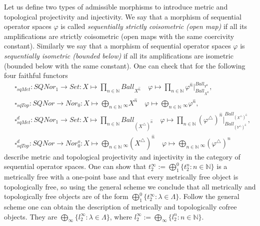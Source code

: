 \documentclass[a0b,landscape]{a0poster}
\begin{document}
\begin{multicols}{4}
Let us define two types of admissible morphisms to introduce metric and topological projectivity and injectivity. We say that a morphism of sequential operator spaces $\varphi$
is called \textit{sequentially strictly coisometric (open map)} if all its amplifications are strictly coisometric (open maps with the same coercivity constant). Similarly
we say that a morphism of sequential operator spaces $\varphi$ is \textit{sequentially isometric (bounded below)} if all its amplifications are isometric 
(bounded below with the same constant). One can check that for the following four faithful functors
$$
\begin{aligned}
&\square_{sqMet} : SQNor_1 \to Set :  X\mapsto\prod_{n \in \mathbb{N}} Ball_{X^{\widehat{n}}}\quad
\varphi\mapsto \prod_{n\in\mathbb{N}} \varphi^{\widehat{n}}|_{Ball_{X^{\widehat{n}}}}^{Ball_{Y^{\widehat{n}}}},\\
&\square_{sqTop} : SQNor \to Nor_0:  X \mapsto \bigoplus_{n \in \mathbb{N}}{}_\infty X^{\widehat{n}}  \quad
\varphi\mapsto\bigoplus_{n\in\mathbb{N}}{}_\infty \varphi^{\widehat{n}},\\
&\square_{sqMet}^d : SQNor_1 \to Set : X\mapsto\prod_{n \in \mathbb{N}} Ball_{(X^\triangle)^{\widehat{n}}}\quad
\varphi\mapsto \prod_{n\in\mathbb{N}} (\varphi^\triangle)^{\widehat{n}}|_{Ball_{(Y^\triangle)^{\widehat{n}}}}^{Ball_{(X^\triangle)^{\widehat{n}}}},\\
&\square_{sqTop}^d : SQNor \to Nor_0^o: X \mapsto \bigoplus_{n \in \mathbb{N}}{}_\infty (X^\triangle)^{\widehat{n}} \quad
\varphi\mapsto\bigoplus_{n\in\mathbb{N}}{}_\infty (\varphi^\triangle)^{\widehat{n}}
\end{aligned}
$$
describe metric and topological projectivity and injectivity in the category of sequential operator spaces. One can show that
$t_2^{\infty} := \bigoplus_1^0 \{t_2^n: n \in \mathbb{N}\}$ is a metrically free with a one-point base and that every
metrically free object is topologically free, so using the general scheme we conclude that all metrically and topologically free objects are of the form
$\bigoplus_1^0\{t_2^\infty: \lambda \in \Lambda\}$. Follow the general scheme one can obtain the description of metrically and topologically cofree objects. They are
$\bigoplus_\infty\{l_2^\infty: \lambda \in \Lambda\}$, where $l_2^{\infty} := \bigoplus_\infty \{l_2^n: n \in \mathbb{N}\}$.












\end{multicols}
\end{document}
